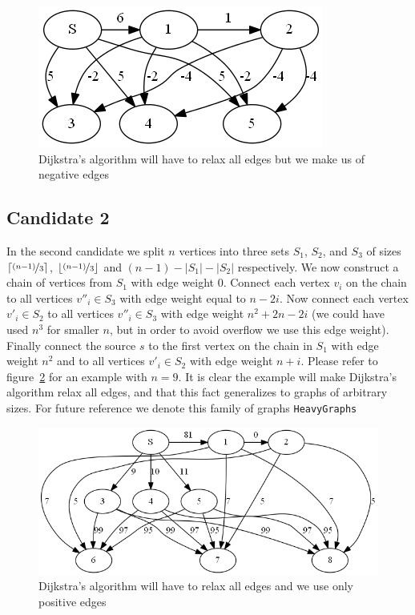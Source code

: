 \documentclass[a4paper,oneside,article,11pt]{memoir}
\begin{document}
\begin{figure}[H]
\centering
\includegraphics[scale=0.8]{../figures/graph_neg_weights.png}
\caption{Dijkstra's algorithm will have to relax all edges but we make us of negative edges}
\label{figure:graph_neg_weights}
\end{figure}

\subsection{Candidate 2}
In the second candidate we split $n$ vertices into three sets $S_1$, $S_2$, and $S_3$ of sizes $\lceil \nicefrac{(n-1)}{3} \rceil$, $\lfloor \nicefrac{(n-1)}{3} \rfloor$ and $(n-1) - \lvert S_1 \rvert - \lvert S_2 \rvert$ respectively. We now construct a chain of vertices from $S_1$ with edge weight $0$. Connect each vertex $v_i$ on the chain to all vertices ${v''}_i \in S_3$ with edge weight equal to $n-2i$. Now connect each vertex ${v'}_i \in S_2$ to all vertices ${v''}_i \in S_3$ with edge weight $n^2 + 2n - 2i$ (we could have used $n^3$ for smaller $n$, but in order to avoid overflow we use this edge weight). Finally connect the source $s$ to the first vertex on the chain in $S_1$ with edge weight $n^2$ and to all vertices ${v'}_i \in S_2$ with edge weight $n+i$. Please refer to figure~\ref{figure:graph_pos_weights} for an example with $n=9$.  It is clear the example will make Dijkstra's algorithm relax all edges, and that this fact generalizes to graphs of arbitrary sizes. For future reference we denote this family of graphs \texttt{HeavyGraphs}

\begin{figure}[H]
\centering
\centerline {
\includegraphics[scale=0.65]{../figures/graph_positive_weights.png}
}
\caption{Dijkstra's algorithm will have to relax all edges and we use only positive edges}
\label{figure:graph_pos_weights}
\end{figure}
\end{document}
